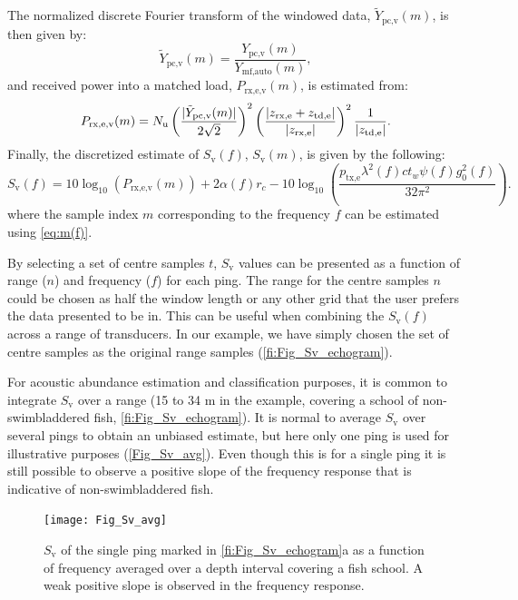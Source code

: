 \documentclass[preprint,12pt,TurnOnLineNumbers]{JASAnew}
\newcommand{\timesym}{t}
\newcommand{\freqsym}{f}
\newcommand{\samplesymt}{n}
\newcommand{\samplesymf}{m}
\newcommand{\nchannels}{N_{\textrm{u}}}
\newcommand{\zrxe}{z_{\textrm{rx,e}}}
\newcommand{\ztde}{z_{\textrm{td,e}}}
\newcommand{\ptxe}{p_{\textrm{tx,e}}}
\newcommand{\ypcvolumef}{Y_{\textrm{pc,v}}}
\newcommand{\ypcvolumenormf}{\tilde{Y}_{\textrm{pc,v}}}
\newcommand{\ymfautof}{Y_{\textrm{mf,auto}}}
\newcommand{\prxevf}{P_{\textrm{rx,e,v}}}
\newcommand{\tslide}{t_w}
\newcommand{\sv}{S_{\textrm{v}}}
\newcommand{\range}{r}
\newcommand{\gainzero}{g_0}
\newcommand{\eqang}{\psi}
\newcommand{\wlen}{\lambda}
\newcommand{\cw}{c}
\newcommand{\absorp}{\alpha}
\begin{document}
The normalized discrete Fourier transform of the windowed data, $\ypcvolumenormf(\samplesymf)$, is then given by:
%
\begin{equation}
\label{eq:FFT_volume_norm}
\ypcvolumenormf(\samplesymf) = \frac{\ypcvolumef(\samplesymf)}{\ymfautof(\samplesymf)},
\end{equation}
%
and received power into a matched load, $\prxevf(\samplesymf)$, is estimated from:
%
\begin{equation}
\label{eq:prx_FFT_volume}
\prxevf(\samplesymf) = \nchannels \left( \frac{|\ypcvolumenormf(\samplesymf)|}{2\sqrt{2}} \right)^2 \left( \frac{|\zrxe+\ztde|}{|\zrxe|}\right)^2 \\
\frac{1}{|\ztde|}. %
\end{equation}
%
Finally, the discretized estimate of $\sv(\freqsym)$, $\sv(\samplesymf)$, is given by the following:
%
\begin{equation}
\label{eq:Sv_FFT}
\sv(\freqsym) = 10\log_{10}(\prxevf(\samplesymf)) + 2\absorp(\freqsym) \range_c - 10\log_{10}\left( \frac{\ptxe \wlen^2(\freqsym) \cw \tslide \eqang(\freqsym) \gainzero^2(\freqsym) }{32\pi^2} \right).
\end{equation}
where the sample index $\samplesymf$ corresponding to the frequency $\freqsym$ can be estimated using {\autoref{eq:m(f)}}.

By selecting a set of centre samples $\timesym$, $\sv$ values can be presented as a function of range ($\samplesymt$) and frequency ($\freqsym$) for each ping. The range for the centre samples $\samplesymt$ could be chosen as half the window length or any other grid that the user prefers the data presented to be in. This can be useful when combining the $\sv(\freqsym)$ across a range of transducers. In our example, we have simply chosen the set of centre samples as the original range samples (\autoref{fi:Fig_Sv_echogram}).

For acoustic abundance estimation and classification purposes, it is common to integrate $\sv$ over a range (15 to 34 m in the example, covering a school of non-swimbladdered fish, \autoref{fi:Fig_Sv_echogram}). It is normal to average $\sv$ over several pings to obtain an unbiased estimate, but here only one ping is used for illustrative purposes (\autoref{Fig_Sv_avg}). Even though this is for a single ping it is still possible to observe a positive slope of the frequency response that is indicative of non-swimbladdered fish. 

\begin{figure}
\texttt{[image: Fig\_Sv\_avg]}
\caption{\label{Fig_Sv_avg} $\sv$ of the single ping marked in \autoref{fi:Fig_Sv_echogram}a as a function of frequency averaged over a depth interval covering a fish school. A weak positive slope is observed in the frequency response.}
\end{figure}
\end{document}
